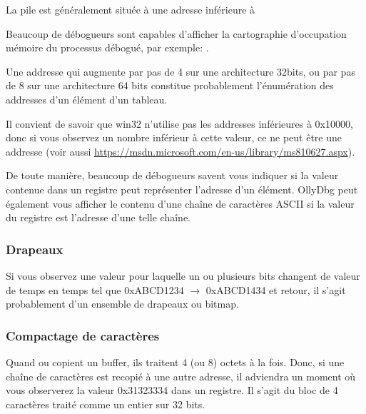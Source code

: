 La pile est généralement située à une adresse inférieure à %

Beaucoup de débogueurs sont capables d'afficher la cartographie d'occupation mémoire du processus
débogué, par exemple: .

Une addresse qui augmente par pas de 4 sur une architecture 32bits, ou par pas de 8 sur une
architecture 64 bits constitue probablement l'énumération des addresses d'un élément d'un tableau.

Il convient de savoir que win32 n'utilise pas les addresses inférieures à 0x10000, donc si vous
observez un nombre inférieur à cette valeur, ce ne peut être une addresse (voir aussi 
\url{https://msdn.microsoft.com/en-us/library/ms810627.aspx}).

De toute manière, beaucoup de débogueurs savent vous indiquer si la valeur contenue dans un
registre peut représenter l'adresse d'un élément. OllyDbg peut également vous afficher le
contenu d'une chaîne de caractères ASCII si la valeur du registre est l'adresse d'une telle
chaîne.

\subsubsection{Drapeaux}

Si vous observez une valeur pour laquelle un ou plusieurs bits changent de valeur de temps en
temps tel que 0xABCD1234 $\rightarrow$ 0xABCD1434 et retour, il s'agit probablement d'un ensemble
de drapeaux ou bitmap.

\subsubsection{Compactage de caractères}

Quand  ou  copient un buffer, ils traitent 4 (ou 8) octets à la fois.
Donc, si une chaîne de caractères  est recopié à une autre adresse, il adviendra un
moment où vous observerez la valeur 0x31323334 dans un registre.
Il s'agit du bloc de 4 caractères traité comme un entier sur 32 bits.

